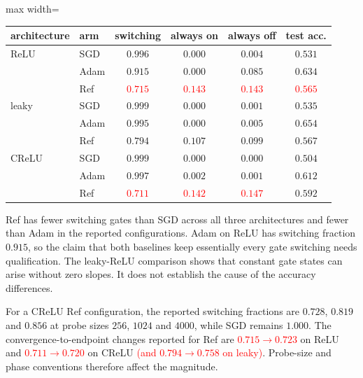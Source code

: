 \documentclass{article}
\newcommand{\nat}[1]{\textcolor{red}{#1}}
\theoremstyle{definition}
\theoremstyle{remark}
\begin{document}
\begin{center}\small
\begin{adjustbox}{max width=\linewidth}
\begin{tabular}{llcccc}
\toprule
architecture & arm & switching & always on & always off & test acc. \\
\midrule
ReLU  & SGD & $0.996$ & $0.000$ & $0.004$ & $0.531$ \\
      & Adam             & $0.915$ & $0.000$ & $0.085$ & $0.634$ \\
      & Ref        & \nat{$0.715$} & \nat{$0.143$} & \nat{$0.143$} & \nat{$0.565$} \\
\midrule
leaky & SGD & $0.999$ & $0.000$ & $0.001$ & $0.535$ \\
      & Adam             & $0.995$ & $0.000$ & $0.005$ & $0.654$ \\
      & Ref        & $0.794$ & $0.107$ & $0.099$ & $0.567$ \\
\midrule
CReLU & SGD & $0.999$ & $0.000$ & $0.000$ & $0.504$ \\
      & Adam             & $0.997$ & $0.002$ & $0.001$ & $0.612$ \\
      & Ref        & \nat{$0.711$} & \nat{$0.142$} & \nat{$0.147$} & $0.592$ \\
\bottomrule
\end{tabular}
\end{adjustbox}
\end{center}

Ref has fewer switching gates than SGD across all three architectures and fewer than Adam in the reported configurations. Adam on ReLU has switching fraction $0.915$, so the claim that both baselines keep essentially every gate switching needs qualification. The leaky-ReLU comparison shows that constant gate states can arise without zero slopes. It does not establish the cause of the accuracy differences.

For a CReLU Ref configuration, the reported switching fractions are $0.728$, $0.819$ and $0.856$ at probe sizes $256$, $1024$ and $4000$, while SGD remains $1.000$. The convergence-to-endpoint changes reported for Ref are \nat{$0.715\to0.723$} on ReLU and \nat{$0.711\to0.720$} on CReLU \nat{(and $0.794\to0.758$ on leaky)}. Probe-size and phase conventions therefore affect the magnitude.
\end{document}
